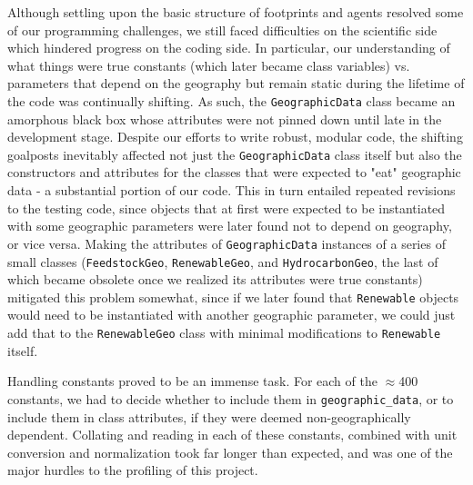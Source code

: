 \documentclass{article}
\begin{document}
Although settling upon the basic structure of footprints and agents resolved some of our programming challenges, we still faced difficulties on the scientific side which hindered progress on the coding side. In particular, our understanding of what things were true constants (which later became class variables) vs. parameters that depend on the geography but remain static during the lifetime of the code was continually shifting. As such, the \texttt{GeographicData} class became an amorphous black box whose attributes were not pinned down until late in the development stage. Despite our efforts to write robust, modular code, the shifting goalposts inevitably affected not just the \texttt{GeographicData} class itself but also the constructors and attributes for the classes that were expected to "eat" geographic data - a substantial portion of our code. This in turn entailed repeated revisions to the testing code, since objects that at first were expected to be instantiated with some geographic parameters were later found not to depend on geography, or vice versa. Making the attributes of \texttt{GeographicData} instances of a series of small classes (\texttt{FeedstockGeo}, \texttt{RenewableGeo}, and \texttt{HydrocarbonGeo}, the last of which became obsolete once we realized its attributes were true constants) mitigated this problem somewhat, since if we later found that \texttt{Renewable} objects would need to be instantiated with another geographic parameter, we could just add that to the \texttt{RenewableGeo} class with minimal modifications to \texttt{Renewable} itself.

Handling constants proved to be an immense task. For each of the $\approx$400 constants, we had to decide whether to include them in \texttt{geographic\_data}, or to include them in class attributes, if they were deemed non-geographically dependent. Collating and reading in each of these constants, combined with unit conversion and normalization took far longer than expected, and was one of the major hurdles to the profiling of this project. 
\end{document}

